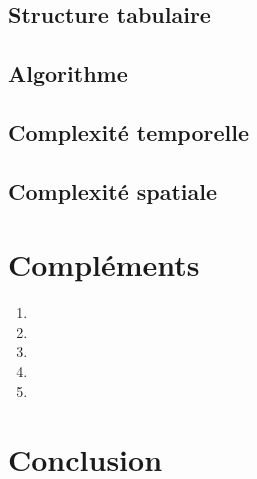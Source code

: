 \documentclass[a4paper, titlepage]{article}
\begin{document}
	\subsection{Structure tabulaire}
	\subsection{Algorithme}
	\subsection{Complexité temporelle}
	\subsection{Complexité spatiale}

\section{Compléments}
\begin{enumerate}
\item
\item
\item
\item
\item
\end{enumerate}

\section{Conclusion}
\end{document}

